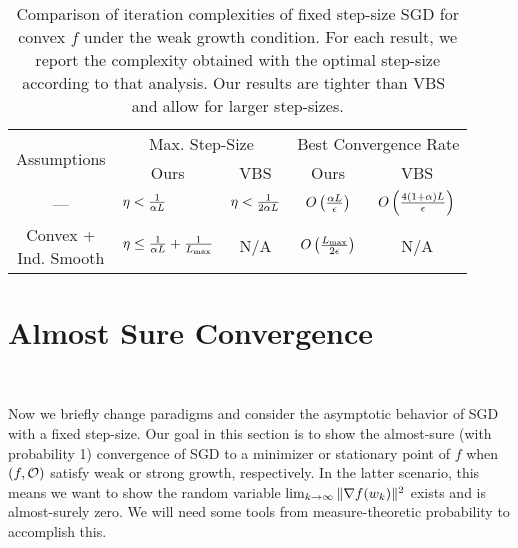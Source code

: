 \begin{table}[t]
    \centering
    \begin{tabular}{c l l c c  }\toprule
        \multirow{2}{*}{Assumptions} & \multicolumn{2}{c}{Max. Step-Size}  & \multicolumn{2}{c}{Best Convergence Rate}\\%
        \cmidrule(lr){2-3} \cmidrule(l){4-5}
                 & \multicolumn{1}{c}{Ours} & \multicolumn{1}{c}{VBS} & \multicolumn{1}{c}{Ours} & \multicolumn{1}{c}{VBS}\\ \midrule
    —            & \( \eta < \frac{1}{\wgc L} \)%
                 & \( \eta < \frac{1}{2 \wgc L} \)%
                 & \( O\rbr{\frac{\wgc L }{\epsilon}} \)%
                 & \( O\rbr{\frac{4 \rbr{1 + \wgc} L}{\epsilon} } \)\\ \addlinespace 
    \makecell{Convex + \\ Ind. Smooth}%
                 & \( \eta \leq \frac{1}{\wgc L} + \frac{1}{\Lmax} \)%
                 & \multicolumn{1}{c}{N/A}%
                 & \( O\rbr{\frac{\Lmax}{2 \epsilon}} \)%
                 & \multicolumn{1}{c}{N/A} \\ \bottomrule 
    \end{tabular}
    \caption[Comparison of iteration complexities of fixed step-size stochastic gradient descent for convex functions under weak growth. ]%
    {Comparison of iteration complexities of fixed step-size \ac{SGD} for convex \( f \) under the weak growth condition.
    For each result, we report the complexity obtained with the optimal step-size according to that analysis.
    Our results are tighter than VBS~\citep{vaswani2019fast} and allow for larger step-sizes.}%
    \label{table:sgd-comparison}
\end{table}


\section{Almost Sure Convergence}~\label{sec:almost-sure}

Now we briefly change paradigms and consider the asymptotic behavior of \ac{SGD} with a fixed step-size.
Our goal in this section is to show the almost-sure (with probability 1) convergence of \ac{SGD} to a minimizer or stationary point of \( f \) when \( \rbr{f, \oracle{}} \) satisfy weak or strong growth, respectively.
In the latter scenario, this means we want to show the random variable \( \lim_{\iter \rightarrow \infty} \norm{\grad(\wk)}^2 \) exists and is almost-surely zero.
We will need some tools from measure-theoretic probability to accomplish this.

